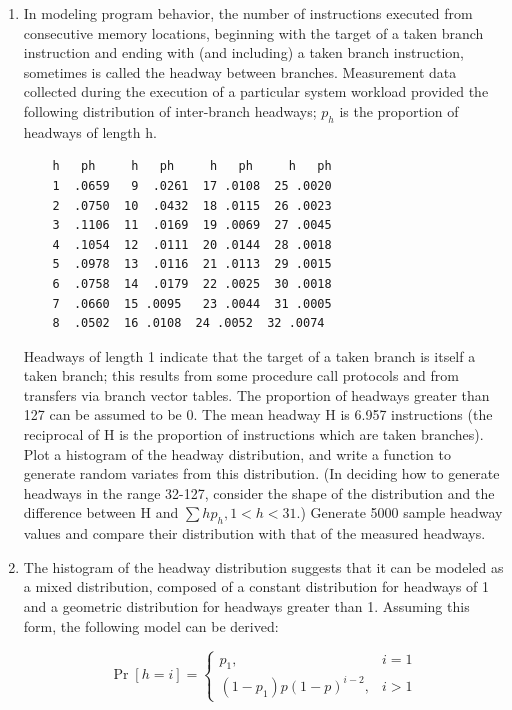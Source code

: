 \begin{enumerate}
  \item In modeling program behavior, the number of instructions executed from
    consecutive memory locations, beginning with the target of a taken branch
    instruction and ending with (and including) a taken branch instruction,
    sometimes is called the headway between branches. Measurement data collected
    during the execution of a particular system workload provided the following
    distribution of inter-branch headways; \ensuremath{p_h} is the proportion of
    headways of length h.

    \begin{verbatim}
    h   ph     h   ph     h   ph     h   ph
    1  .0659   9  .0261  17 .0108  25 .0020
    2  .0750  10  .0432  18 .0115  26 .0023
    3  .1106  11  .0169  19 .0069  27 .0045
    4  .1054  12  .0111  20 .0144  28 .0018
    5  .0978  13  .0116  21 .0113  29 .0015
    6  .0758  14  .0179  22 .0025  30 .0018
    7  .0660  15 .0095   23 .0044  31 .0005
    8  .0502  16 .0108  24 .0052  32 .0074
    \end{verbatim}

    Headways of length 1 indicate that the target of a taken branch is itself a
    taken branch; this results from some procedure call protocols and from
    transfers via branch vector tables. The proportion of headways greater than
    127 can be assumed to be 0. The mean headway H is 6.957 instructions (the
    reciprocal of H is the proportion of instructions which are taken branches).
    Plot a histogram of the headway distribution, and write a function to
    generate random variates from this distribution. (In deciding how to
    generate headways in the range 32-127, consider the shape of the
    distribution and the difference between H and \ensuremath{\sum h p_h, 1<h<31}.) Generate
    5000 sample headway values and compare their distribution with that of the
    measured headways.

  \item The histogram of the headway distribution suggests that it can be
    modeled as a mixed distribution, composed of a constant distribution for
    headways of 1 and a geometric distribution for headways greater than 1.
    Assuming this form, the following model can be derived:

    \begin{equation}
      \Pr[h=i] =
      \begin{cases}
        p_1, & i = 1 \\
        (1-p_1)p(1-p)^{i-2}, & i > 1
      \end{cases}
      \tag{1.14}
    \end{equation}


\end{enumerate}
